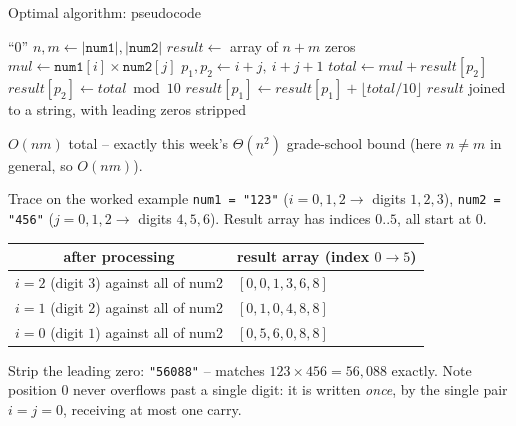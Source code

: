 \documentclass[11pt,aspectratio=169]{beamer}
\begin{document}
\begin{frame}{Optimal algorithm: pseudocode}
  \footnotesize
  \begin{algorithmic}[1]
       \Return ``0'' \EndIf
      \State $n, m \gets |\texttt{num1}|, |\texttt{num2}|$
      \State $result \gets$ array of $n+m$ zeros
          \State $mul \gets \texttt{num1}[i] \times \texttt{num2}[j]$
          \State $p_1, p_2 \gets i+j,\ i+j+1$
          \State $total \gets mul + result[p_2]$
          \State $result[p_2] \gets total \bmod 10$
          \State $result[p_1] \gets result[p_1] + \lfloor total / 10 \rfloor$
        \EndFor
      \EndFor
      \State \Return $result$ joined to a string, with leading zeros stripped
    \EndFunction
  \end{algorithmic}
  $O(nm)$ total -- exactly this week's $\Theta(n^2)$ grade-school bound (here $n\ne m$ in
  general, so $O(nm)$).
\end{frame}

\begin{frame}{Trace on the worked example}
  \small
  \texttt{num1 = "123"} ($i=0,1,2 \to$ digits $1,2,3$), \texttt{num2 = "456"}
  ($j=0,1,2 \to$ digits $4,5,6$). Result array has indices $0..5$, all start at $0$.
  \begin{center}
  \begin{tabular}{@{}cl@{}}
    \toprule
    after processing & result array (index $0\to5$) \\
    \midrule
    $i=2$ (digit $3$) against all of num2 & $[0,0,1,3,6,8]$ \\
    $i=1$ (digit $2$) against all of num2 & $[0,1,0,4,8,8]$ \\
    $i=0$ (digit $1$) against all of num2 & $[0,5,6,0,8,8]$ \\
    \bottomrule
  \end{tabular}
  \end{center}
  Strip the leading zero: \texttt{"56088"} -- matches $123 \times 456 = 56{,}088$ exactly.
  Note position $0$ never overflows past a single digit: it is written \emph{once},
  by the single pair $i{=}j{=}0$, receiving at most one carry.
\end{frame}
\end{document}
